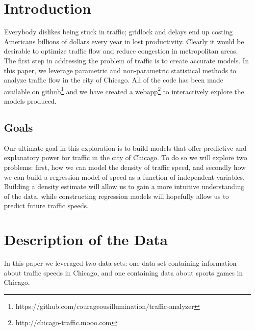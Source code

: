\documentclass[12pt]{article}
\begin{document}
\maketitle
\section{Introduction}
Everybody dislikes being stuck in traffic; gridlock and delays end up costing Americans billions of dollars every year in lost productivity. Clearly it would be desirable to optimize traffic flow and reduce congestion in metropolitan areas. The first step in addressing the problem of traffic is to create accurate models. In this paper, we leverage parametric and non-parametric statistical methods to analyze traffic flow in the city of Chicago. All of the code has been made available on github\footnote{https://github.com/courageousillumination/traffic-analyzer} and we have created a webapp\footnote{http://chicago-traffic.mooo.com} to interactively explore the models produced.
\subsection{Goals}
Our ultimate goal in this exploration is to build models that offer predictive and explanatory power for traffic in the city of Chicago. To do so we will explore two problems: first, how we can model the density of traffic speed, and secondly how we can build a regression model of speed as a function of independent variables. Building a density estimate will allow us to gain a more intuitive understanding of the data, while constructing regression models will hopefully allow us to predict future traffic speeds.
\section{Description of the Data}
In this paper we leveraged two data sets: one data set containing information about traffic speeds in Chicago, and one containing data about sports games in Chicago.
\end{document}
